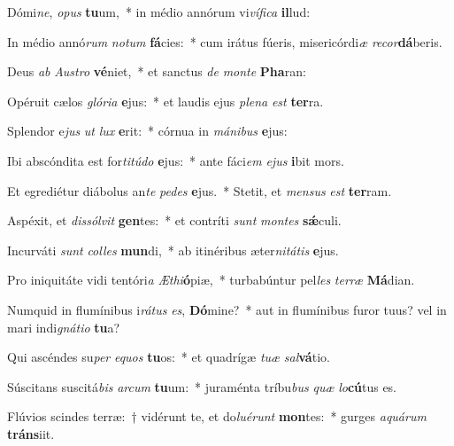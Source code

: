 \item Dómi\textit{ne}, \textit{o}\textit{pus} \textbf{tu}um,~* in médio annórum vi\textit{ví}\textit{fi}\textit{ca} \textbf{il}lud:
\item In médio annó\textit{rum} \textit{no}\textit{tum} \textbf{fá}cies:~* cum irátus fúeris, misericórdi\textit{æ} \textit{re}\textit{cor}\textbf{dá}beris.
\item Deus \textit{ab} \textit{Aus}\textit{tro} \textbf{vé}niet,~* et sanctus \textit{de} \textit{mon}\textit{te} \textbf{Pha}ran:
\item Opéruit cælos \textit{gló}\textit{ri}\textit{a} \textbf{e}jus:~* et laudis ejus \textit{ple}\textit{na} \textit{est} \textbf{ter}ra.
\item Splendor e\textit{jus} \textit{ut} \textit{lux} \textbf{e}rit:~* córnua in \textit{má}\textit{ni}\textit{bus} \textbf{e}jus:
\item Ibi abscóndita est for\textit{ti}\textit{tú}\textit{do} \textbf{e}jus:~* ante fáci\textit{em} \textit{e}\textit{jus} \textbf{i}bit mors.
\item Et egrediétur diábolus an\textit{te} \textit{pe}\textit{des} \textbf{e}jus.~* Stetit, et \textit{men}\textit{sus} \textit{est} \textbf{ter}ram.
\item Aspéxit, et \textit{dis}\textit{sól}\textit{vit} \textbf{gen}tes:~* et contríti \textit{sunt} \textit{mon}\textit{tes} \textbf{sǽ}culi.
\item Incurváti \textit{sunt} \textit{col}\textit{les} \textbf{mun}di,~* ab itinéribus æter\textit{ni}\textit{tá}\textit{tis} \textbf{e}jus.
\item Pro iniquitáte vidi tentóri\textit{a} \textit{Æ}\textit{thi}\textbf{ó}piæ,~* turbabúntur pel\textit{les} \textit{ter}\textit{ræ} \textbf{Má}dian.
\item Numquid in flumínibus i\textit{rá}\textit{tus} \textit{es}, \textbf{Dó}mine?~* aut in flumínibus furor tuus? vel in mari indi\textit{gná}\textit{ti}\textit{o} \textbf{tu}a?
\item Qui ascéndes su\textit{per} \textit{e}\textit{quos} \textbf{tu}os:~* et quadrígæ \textit{tu}\textit{æ} \textit{sal}\textbf{vá}tio.
\item Súscitans suscitá\textit{bis} \textit{ar}\textit{cum} \textbf{tu}um:~* juraménta tríbu\textit{bus} \textit{quæ} \textit{lo}\textbf{cú}tus es.
\item Flúvios scindes terræ:~† vidérunt te, et do\textit{lu}\textit{é}\textit{runt} \textbf{mon}tes:~* gurges \textit{a}\textit{quá}\textit{rum} \textbf{tráns}iit.
